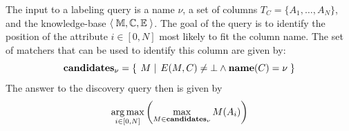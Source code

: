 The input to a labeling query is a name $\nu$, a set of columns $T_C = \{A_1, \ldots, A_N\}$, and the knowledge-base $\left<\;{\mathbb M, \mathbb C, \mathbb E}\;\right>$. 
The goal of the query is to identify the position of the attribute $i \in [0,N]$ most likely to fit the column name.
The set of matchers that can be used to identify this column are given by:
$$\textbf{candidates}_\nu = \left\{\left.\;{M}\;\right|\;{E(M, C) \neq \bot \wedge \textbf{name}(C) = \nu}\;\right\}$$
The answer to the discovery query then is given by
$$\operatorname*{arg\,max}_{i \in [0,N]} \left( \max_{M \in \textbf{candidates}_\nu} M(A_i)\right)$$
